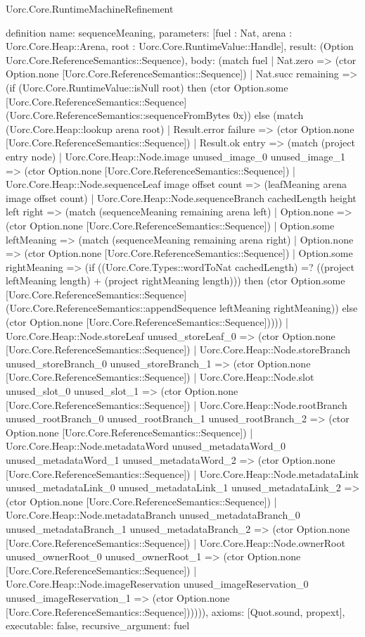 \begin{lexlean}{Uorc.Core.RuntimeMachineRefinement}
\begin{semanticmodule}
definition{
  name: sequenceMeaning,
  parameters: [fuel : Nat, arena : Uorc.Core.Heap::Arena, root : Uorc.Core.RuntimeValue::Handle],
  result: (Option Uorc.Core.ReferenceSemantics::Sequence),
  body: (match fuel
    | Nat.zero => (ctor Option.none [Uorc.Core.ReferenceSemantics::Sequence])
    | Nat.succ remaining => (if (Uorc.Core.RuntimeValue::isNull root) then (ctor Option.some [Uorc.Core.ReferenceSemantics::Sequence] (Uorc.Core.ReferenceSemantics::sequenceFromBytes 0x)) else (match (Uorc.Core.Heap::lookup arena root)
      | Result.error failure => (ctor Option.none [Uorc.Core.ReferenceSemantics::Sequence])
      | Result.ok entry => (match (project entry node)
        | Uorc.Core.Heap::Node.image unused_image_0 unused_image_1 => (ctor Option.none [Uorc.Core.ReferenceSemantics::Sequence])
        | Uorc.Core.Heap::Node.sequenceLeaf image offset count => (leafMeaning arena image offset count)
        | Uorc.Core.Heap::Node.sequenceBranch cachedLength height left right => (match (sequenceMeaning remaining arena left)
          | Option.none => (ctor Option.none [Uorc.Core.ReferenceSemantics::Sequence])
          | Option.some leftMeaning => (match (sequenceMeaning remaining arena right)
            | Option.none => (ctor Option.none [Uorc.Core.ReferenceSemantics::Sequence])
            | Option.some rightMeaning => (if ((Uorc.Core.Types::wordToNat cachedLength) =? ((project leftMeaning length) + (project rightMeaning length))) then (ctor Option.some [Uorc.Core.ReferenceSemantics::Sequence] (Uorc.Core.ReferenceSemantics::appendSequence leftMeaning rightMeaning)) else (ctor Option.none [Uorc.Core.ReferenceSemantics::Sequence]))))
        | Uorc.Core.Heap::Node.storeLeaf unused_storeLeaf_0 => (ctor Option.none [Uorc.Core.ReferenceSemantics::Sequence])
        | Uorc.Core.Heap::Node.storeBranch unused_storeBranch_0 unused_storeBranch_1 => (ctor Option.none [Uorc.Core.ReferenceSemantics::Sequence])
        | Uorc.Core.Heap::Node.slot unused_slot_0 unused_slot_1 => (ctor Option.none [Uorc.Core.ReferenceSemantics::Sequence])
        | Uorc.Core.Heap::Node.rootBranch unused_rootBranch_0 unused_rootBranch_1 unused_rootBranch_2 => (ctor Option.none [Uorc.Core.ReferenceSemantics::Sequence])
        | Uorc.Core.Heap::Node.metadataWord unused_metadataWord_0 unused_metadataWord_1 unused_metadataWord_2 => (ctor Option.none [Uorc.Core.ReferenceSemantics::Sequence])
        | Uorc.Core.Heap::Node.metadataLink unused_metadataLink_0 unused_metadataLink_1 unused_metadataLink_2 => (ctor Option.none [Uorc.Core.ReferenceSemantics::Sequence])
        | Uorc.Core.Heap::Node.metadataBranch unused_metadataBranch_0 unused_metadataBranch_1 unused_metadataBranch_2 => (ctor Option.none [Uorc.Core.ReferenceSemantics::Sequence])
        | Uorc.Core.Heap::Node.ownerRoot unused_ownerRoot_0 unused_ownerRoot_1 => (ctor Option.none [Uorc.Core.ReferenceSemantics::Sequence])
        | Uorc.Core.Heap::Node.imageReservation unused_imageReservation_0 unused_imageReservation_1 => (ctor Option.none [Uorc.Core.ReferenceSemantics::Sequence]))))),
  axioms: [Quot.sound, propext],
  executable: false,
  recursive_argument: fuel
}


\end{semanticmodule}
\end{lexlean}
